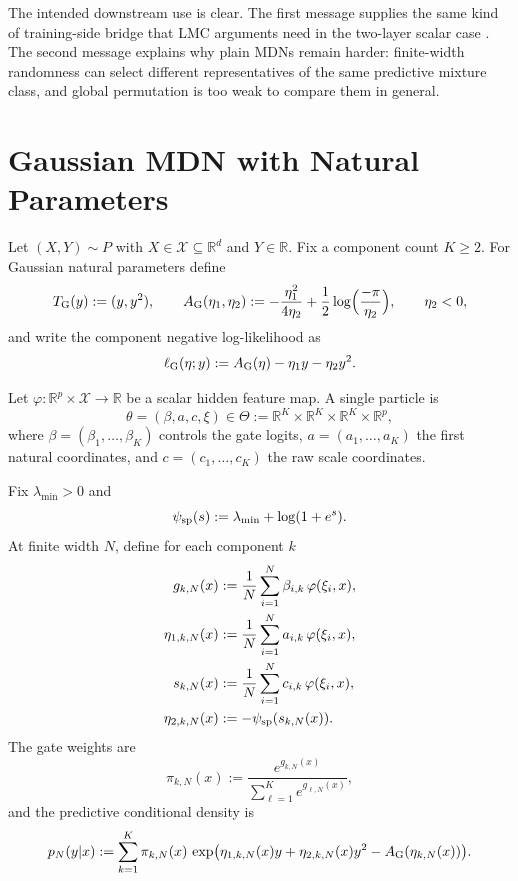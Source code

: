 \documentclass[11pt]{article}
\theoremstyle{definition}
\newcommand{\R}{\mathbb{R}}
\newcommand{\mc}[1]{\mathcal{#1}}
\begin{document}
The intended downstream use is clear. The first message supplies the same kind
of training-side bridge that LMC arguments need in the two-layer scalar case
\cite{FerbachEtAl2024}. The second message explains why plain MDNs remain
harder: finite-width randomness can select different representatives of the same
predictive mixture class, and global permutation is too weak to compare them in
general.

\section{Gaussian MDN with Natural Parameters}

Let $(X,Y)\sim P$ with $X\in\mc{X}\subseteq \R^d$ and $Y\in\R$. Fix a component
count $K\ge 2$. For Gaussian natural parameters define
\[
  T_{\rm G}(y):=(y,y^2),
  \qquad
  A_{\rm G}(\eta_1,\eta_2)
  :=
  -\frac{\eta_1^2}{4\eta_2}
  + \frac12 \log\!\Big(\frac{-\pi}{\eta_2}\Big),
  \qquad \eta_2<0,
\]
and write the component negative log-likelihood as
\[
  \ell_{\rm G}(\eta;y)
  :=
  A_{\rm G}(\eta)-\eta_1 y-\eta_2 y^2.
\]

Let $\varphi:\R^p\times \mc{X}\to \R$ be a scalar hidden feature map. A single particle
is
\[
  \theta=(\beta,a,c,\xi)\in \Theta:=\R^K\times\R^K\times\R^K\times \R^p,
\]
where $\beta=(\beta_1,\dots,\beta_K)$ controls the gate logits,
$a=(a_1,\dots,a_K)$ the first natural coordinates, and
$c=(c_1,\dots,c_K)$ the raw scale coordinates.

Fix $\lambda_{\min}>0$ and
\[
  \psi_{\rm sp}(s):=\lambda_{\min}+\log(1+e^s).
\]
At finite width $N$, define for each component $k$
\begin{align}
  g_{k,N}(x)
  &:=
  \frac1N\sum_{i=1}^N \beta_{i,k}\,\varphi(\xi_i,x),
  \\
  \eta_{1,k,N}(x)
  &:=
  \frac1N\sum_{i=1}^N a_{i,k}\,\varphi(\xi_i,x),
  \\
  s_{k,N}(x)
  &:=
  \frac1N\sum_{i=1}^N c_{i,k}\,\varphi(\xi_i,x),
  \\
  \eta_{2,k,N}(x)
  &:=
  -\psi_{\rm sp}(s_{k,N}(x)).
\end{align}
The gate weights are
\[
  \pi_{k,N}(x)
  :=
  \frac{e^{g_{k,N}(x)}}{\sum_{\ell=1}^K e^{g_{\ell,N}(x)}},
\]
and the predictive conditional density is
\begin{equation}
  p_N(y|x)
  :=
  \sum_{k=1}^K
  \pi_{k,N}(x)\,
  \exp\!\big(
    \eta_{1,k,N}(x)y + \eta_{2,k,N}(x)y^2 - A_{\rm G}(\eta_{k,N}(x))
  \big).
  \label{eq:finite-mdn-density}
\end{equation}
\end{document}
